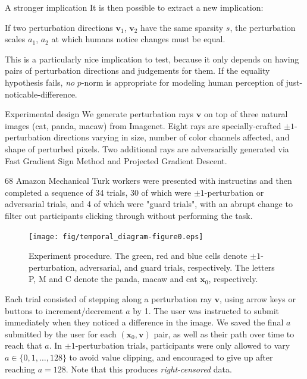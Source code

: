 \documentclass[final,notheorems]{beamer}
\newlength{\colwidth}
\def\bfx{\mathbf x}
\def\bfv{\mathbf v}
\begin{document}
\begin{frame}[t]
\begin{columns}[t]
\begin{column}{\colwidth}
\begin{block}{A stronger implication}
    It is then possible to extract a new implication:

    \hspace*{.1\linewidth}\colorbox{highlightbg}{\begin{minipage}{.8\linewidth}
      If two perturbation directions $\bfv_1$, $\bfv_2$ have the same sparsity $s$, the perturbation scales $a_1$, $a_2$ at which humans notice changes must be equal.
    \end{minipage}}

    This is a particularly nice implication to test, because it only depends on having pairs of perturbation directions and judgements for them.
    If the equality hypothesis fails, \emph{no} $p$-norm is appropriate for modeling human perception of just-noticable-difference.
  \end{block}

  \begin{block}{Experimental design}
    We generate perturbation rays $\bfv$ on top of three natural images (cat, panda, macaw) from Imagenet.
    Eight rays are specially-crafted $\pm1$-perturbation directions varying in size, number of color channels affected, and shape of perturbed pixels.
    Two additional rays are adversarially generated via Fast Gradient Sign Method and Projected Gradient Descent.

    68 Amazon Mechanical Turk workers were presented with instructins and then completed a sequence of 34 trials, 30 of which were $\pm1$-perturbation or adversarial trials,
    and 4 of which were "guard trials", with an abrupt change to filter out participants clicking through without performing the task.

    \begin{figure}
      \centering
      \texttt{[image: fig/temporal\_diagram-figure0.eps]}
      \caption{Experiment procedure.
      The green, red and blue cells denote $\pm 1$-perturbation, adversarial, and guard trials, respectively.
      The letters P, M and C denote the panda, macaw and cat $\bfx_0$, respectively.
      }
      \label{fig:temporal}
    \end{figure}

    Each trial consisted of stepping along a perturbation ray $\bfv$, using arrow keys or buttons to increment/decrement $a$ by 1.
    The user was instructed to submit immediately when they noticed a difference in the image.
    We saved the final $a$ submitted by the user for each $(\bfx_0, \bfv)$ pair, as well as their path over time to reach that $a$.
    In $\pm1$-perturbation trials, participants were only allowed to vary $a\in\{0,1,\ldots,128\}$ to avoid value clipping, and encouraged to give up after reaching $a=128$.
    Note that this produces \emph{right-censored} data.


\end{block}
\end{column}
\end{columns}
\end{frame}
\end{document}
